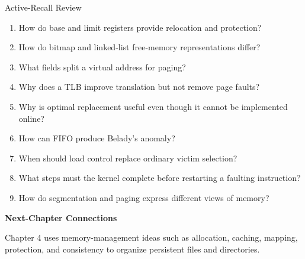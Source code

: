 \documentclass[10pt,letterpaper]{article}
\begin{document}
\enlargethispage{2\baselineskip}
\begin{studybox}{Active-Recall Review}
\small
\begin{enumerate}
  \item How do base and limit registers provide relocation and protection?
  \item How do bitmap and linked-list free-memory representations differ?
  \item What fields split a virtual address for paging?
  \item Why does a TLB improve translation but not remove page faults?
  \item Why is optimal replacement useful even though it cannot be implemented online?
  \item How can FIFO produce Belady's anomaly?
  \item When should load control replace ordinary victim selection?
  \item What steps must the kernel complete before restarting a faulting instruction?
  \item How do segmentation and paging express different views of memory?
\end{enumerate}
\end{studybox}

\par\medskip
{\color{navy}\bfseries Next-Chapter Connections}\par\smallskip
Chapter 4 uses memory-management ideas such as allocation, caching, mapping, protection, and consistency to organize persistent files and directories.
\normalsize
\end{document}
